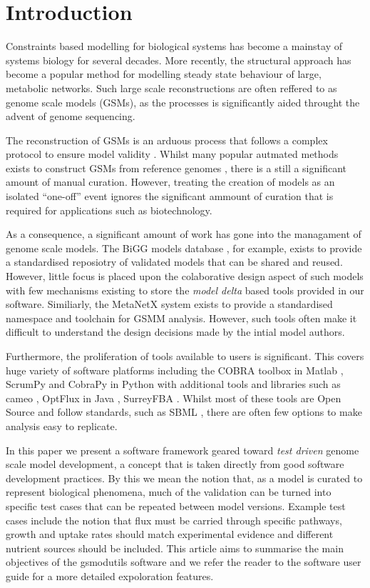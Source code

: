 \documentclass{bioinfo}
\begin{document}
\maketitle

\section{Introduction}
Constraints based modelling for biological systems has become a mainstay of systems biology for several decades.
More recently, the structural approach has become a popular method for modelling steady state behaviour of large, metabolic networks.
Such large scale reconstructions are often reffered to as genome scale models (GSMs), as the processes is significantly aided throught the advent of genome sequencing.

The reconstruction of GSMs is an arduous process that follows a complex protocol to ensure model validity \cite{Palson}.
Whilst many popular autmated methods exists to construct GSMs from reference genomes \cite{ModelSEED, ScrumPy}, there is a still a significant amount of manual curation.
However, treating the creation of models as an isolated ``one-off'' event ignores the significant ammount of curation that is required for applications such as biotechnology.

As a consequence, a significant amount of work has gone into the managament of genome scale models.
The BiGG models database \cite{BiGG}, for example, exists to provide a standardised reposiotry of validated models that can be shared and reused.
However, little focus is placed upon the colaborative design aspect of such models with few mechanisms existing to store the \textit{model delta} based tools provided in our software.
Similiarly, the MetaNetX \cite{MetaNetX} system exists to provide a standardised namespace and toolchain for GSMM analysis.
However, such tools often make it difficult to understand the design decisions made by the intial model authors.

Furthermore, the proliferation of tools available to users is significant.
This covers huge variety of software platforms including the COBRA toolbox in Matlab \cite{},
ScrumPy and CobraPy in Python \cite{ScrumPy, cobrapy} with additional tools and libraries such as cameo \cite{}, OptFlux in Java \cite{}, SurreyFBA \cite{}.
Whilst most of these tools are Open Source and follow standards, such as SBML \cite{}, there are often few options to make analysis easy to replicate.


In this paper we present a software framework geared toward \textit{test driven} genome scale model development, a concept that is taken directly from good software development practices.
By this we mean the notion that, as a model is curated to represent biological phenomena, much of the validation can be turned into specific test cases that can be repeated between model versions.
Example test cases include the notion that flux must be carried through specific pathways, growth and uptake rates should match experimental evidence and different nutrient sources should be included.
This article aims to summarise the main objectives of the gsmodutils software and we refer the reader to the software user guide for a more detailed expoloration features.
\end{document}
